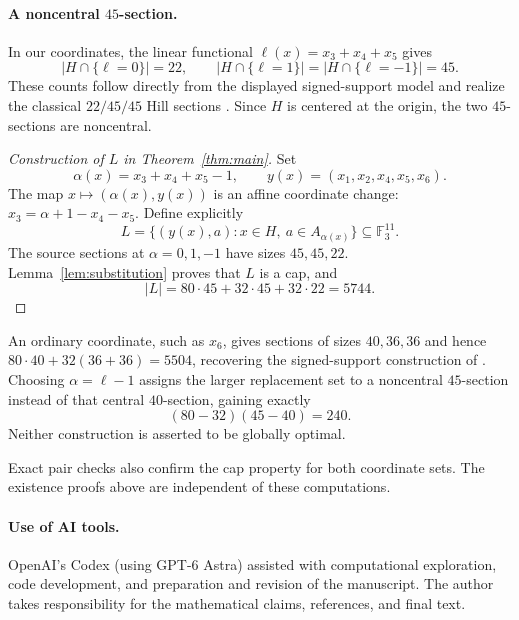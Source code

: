 \documentclass[11pt]{article}
\newcommand{\F}{\mathbb F_3}
\begin{document}
\paragraph{A noncentral $45$-section.}
In our coordinates, the linear functional $\ell(x)=x_3+x_4+x_5$ gives
\[
 |H\cap\{\ell=0\}|=22,\qquad
 |H\cap\{\ell=1\}|=|H\cap\{\ell=-1\}|=45.
\]
These counts follow directly from the displayed signed-support model and
realize the classical $22/45/45$ Hill sections
\cite[Lemma 3.1(a)]{thackeray}. Since $H$ is centered at the origin,
the two $45$-sections are noncentral.

\begin{proof}[Construction of $L$ in Theorem~\ref{thm:main}]
Set
\[
 \alpha(x)=x_3+x_4+x_5-1,\qquad
 y(x)=(x_1,x_2,x_4,x_5,x_6).
\]
The map $x\mapsto(\alpha(x),y(x))$ is an affine coordinate change:
$x_3=\alpha+1-x_4-x_5$. Define explicitly
\begin{equation}\label{eq:5744}
 L=\{(y(x),a):x\in H,\ a\in A_{\alpha(x)}\}\subseteq\F^{11}.
\end{equation}
The source sections at $\alpha=0,1,-1$ have sizes $45,45,22$.
Lemma~\ref{lem:substitution} proves that $L$ is a cap, and
\[
 |L|=80\cdot45+32\cdot45+32\cdot22=5744.
\]
\end{proof}

An ordinary coordinate, such as $x_6$, gives sections of sizes $40,36,36$
and hence $80\cdot40+32(36+36)=5504$, recovering the signed-support
construction of \cite[Corollary 2]{karapetyan}. Choosing $\alpha=\ell-1$
assigns the larger replacement set to a noncentral $45$-section instead
of that central $40$-section, gaining exactly
\[
 (80-32)(45-40)=240.
\]
Neither construction is asserted to be globally optimal.

Exact pair checks also confirm the cap property for both coordinate
sets. The existence proofs above are independent of these computations.

\paragraph{Use of AI tools.}
OpenAI's Codex (using GPT-6 Astra) assisted with computational exploration,
code development, and preparation and revision of the manuscript.
The author takes responsibility for the mathematical claims, references,
and final text.
\end{document}
